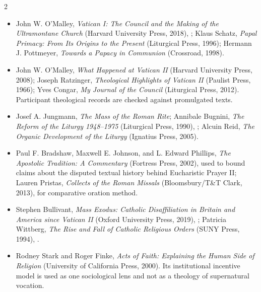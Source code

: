 \begin{multicols}{2}
{\footnotesize
\begin{itemize}[itemsep=0.1em,topsep=0.15em]
\item John W. O'Malley, \emph{Vatican I: The Council and the Making of the Ultramontane Church} (Harvard University Press, 2018), ; Klaus Schatz, \emph{Papal Primacy: From Its Origins to the Present} (Liturgical Press, 1996); Hermann J. Pottmeyer, \emph{Towards a Papacy in Communion} (Crossroad, 1998).
\item John W. O'Malley, \emph{What Happened at Vatican II} (Harvard University Press, 2008); Joseph Ratzinger, \emph{Theological Highlights of Vatican II} (Paulist Press, 1966); Yves Congar, \emph{My Journal of the Council} (Liturgical Press, 2012). Participant theological records are checked against promulgated texts.
\item Josef A. Jungmann, \emph{The Mass of the Roman Rite}; Annibale Bugnini, \emph{The Reform of the Liturgy 1948--1975} (Liturgical Press, 1990), ; Alcuin Reid, \emph{The Organic Development of the Liturgy} (Ignatius Press, 2005).
\item Paul F. Bradshaw, Maxwell E. Johnson, and L. Edward Phillips, \emph{The Apostolic Tradition: A Commentary} (Fortress Press, 2002), used to bound claims about the disputed textual history behind Eucharistic Prayer II; Lauren Pristas, \emph{Collects of the Roman Missals} (Bloomsbury/T\&T Clark, 2013), for comparative oration method.
\item Stephen Bullivant, \emph{Mass Exodus: Catholic Disaffiliation in Britain and America since Vatican II} (Oxford University Press, 2019), ; Patricia Wittberg, \emph{The Rise and Fall of Catholic Religious Orders} (SUNY Press, 1994), .
\item Rodney Stark and Roger Finke, \emph{Acts of Faith: Explaining the Human Side of Religion} (University of California Press, 2000). Its institutional incentive model is used as one sociological lens and not as a theology of supernatural vocation.
\end{itemize}}

\end{multicols}
\endgroup

